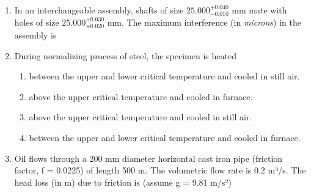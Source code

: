 \documentclass[journal,11pt,onecolumn]{IEEEtran}
\begin{document}
\begin{enumerate}
    \item In an interchangeable assembly, shafts of size $25.000^{+0.040}_{-0.010}$ mm mate with holes of size \(25.000^{+0.030}_{+0.020}\) mm. The maximum interference (in \textit{microns}) in the assembly is

          \begin{enumerate}
          \end{enumerate}

    \item During normalizing process of steel, the specimen is heated

          \begin{enumerate}
              \item between the upper and lower critical temperature and cooled in still air.
              \item above the upper critical temperature and cooled in furnace.
              \item above the upper critical temperature and cooled in still air.
              \item between the upper and lower critical temperature and cooled in furnace.
          \end{enumerate}

    \item Oil flows through a 200 mm diameter horizontal cast iron pipe (friction factor, f = 0.0225) of length 500 m. The volumetric flow rate is 0.2 m³/s. The head loss (in m) due to friction is (assume g = 9.81 m/s²)

          \begin{enumerate}
          \end{enumerate}


\end{enumerate}
\end{document}
